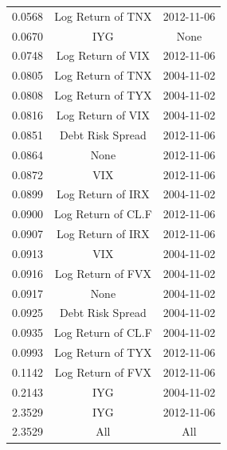 \documentclass[11pt,3p,review,authoryear]{elsarticle}
\theoremstyle{definition}
\begin{document}
\begin{table}[ht]
\begin{tabular}{ccc}
    0.0568 & Log Return of TNX & 2012-11-06 \\ 
    0.0670 & IYG & None \\ 
    0.0748 & Log Return of VIX & 2012-11-06 \\ 
    0.0805 & Log Return of TNX & 2004-11-02 \\ 
    0.0808 & Log Return of TYX & 2004-11-02 \\ 
    0.0816 & Log Return of VIX & 2004-11-02 \\ 
    0.0851 & Debt Risk Spread & 2012-11-06 \\ 
    0.0864 & None & 2012-11-06 \\ 
    0.0872 & VIX & 2012-11-06 \\ 
    0.0899 & Log Return of IRX & 2004-11-02 \\ 
    0.0900 & Log Return of CL.F & 2012-11-06 \\ 
    0.0907 & Log Return of IRX & 2012-11-06 \\ 
    0.0913 & VIX & 2004-11-02 \\ 
    0.0916 & Log Return of FVX & 2004-11-02 \\ 
    0.0917 & None & 2004-11-02 \\ 
    0.0925 & Debt Risk Spread & 2004-11-02 \\ 
    0.0935 & Log Return of CL.F & 2004-11-02 \\ 
    0.0993 & Log Return of TYX & 2012-11-06 \\ 
    0.1142 & Log Return of FVX & 2012-11-06 \\ 
    0.2143 & IYG & 2004-11-02 \\ 
    2.3529 & IYG & 2012-11-06 \\ 
    \rowcolor{red} 2.3529 & All & All \\
     \hline
  \end{tabular}
  
  \endgroup
  \end{table}
\end{document}
